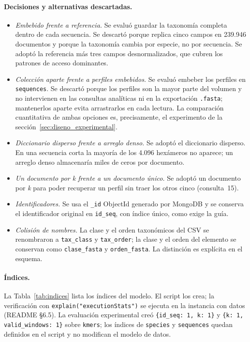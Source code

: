 \documentclass[journal]{IEEEtran}
\begin{document}
\paragraph*{Decisiones y alternativas descartadas.}
\begin{itemize}
  \item \textit{Embebido frente a referencia.} Se evaluó guardar la taxonomía completa
        dentro de cada secuencia. Se descartó porque replica cinco campos en 239.946
        documentos y porque la taxonomía cambia por especie, no por secuencia. Se adoptó la
        referencia más tres campos desnormalizados, que cubren los patrones de acceso
        dominantes.
  \item \textit{Colección aparte frente a perfiles embebidos.} Se evaluó embeber los
        perfiles en \texttt{sequences}. Se descartó porque los perfiles son la mayor parte
        del volumen y no intervienen en las consultas analíticas ni en la exportación
        \texttt{.fasta}; mantenerlos aparte evita arrastrarlos en cada lectura. La
        comparación cuantitativa de ambas opciones es, precisamente, el experimento de la
        sección~\ref{sec:diseno_experimental}.
  \item \textit{Diccionario disperso frente a arreglo denso.} Se adoptó el diccionario
        disperso. En una secuencia corta la mayoría de los 4.096 hexámeros no aparece; un
        arreglo denso almacenaría miles de ceros por documento.
  \item \textit{Un documento por \textit{k} frente a un documento único.} Se adoptó un
        documento por \textit{k} para poder recuperar un perfil sin traer los otros cinco
        (consulta~15).
  \item \textit{Identificadores.} Se usa el \texttt{\_id} ObjectId generado por MongoDB y
        se conserva el identificador original en \texttt{id\_seq}, con índice único, como
        exige la guía.
  \item \textit{Colisión de nombres.} La clase y el orden taxonómicos del CSV se
        renombraron a \texttt{tax\_class} y \texttt{tax\_order}; la clase y el orden del elemento
        se conservan como \texttt{clase\_fasta} y \texttt{orden\_fasta}. La distinción es
        explícita en el esquema.
\end{itemize}

\paragraph*{Índices.}
La Tabla~\ref{tab:indices} lista los índices del modelo. El script
 los crea; la verificación con
\texttt{explain("executionStats")} se ejecuta en la instancia con datos
(README \S6.5). La evaluación experimental creó \texttt{\{id\_seq: 1, k: 1\}} y
\texttt{\{k: 1, valid\_windows: 1\}} sobre \texttt{kmers}; los índices de
\texttt{species} y \texttt{sequences} quedan definidos en el script y no modifican el
modelo de datos.
\end{document}
